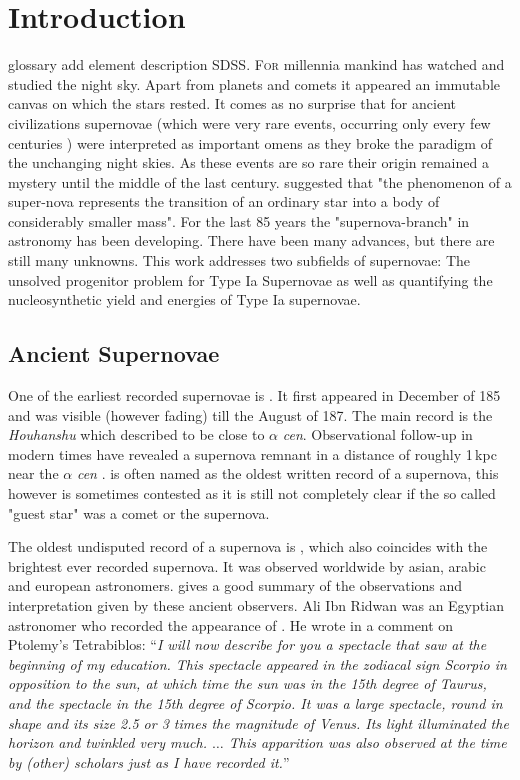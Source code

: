 \chapter{Introduction}
\label{chap:intro}
glossary add element description SDSS.
\lettrine[lines=4]{F}{or} millennia mankind has watched and studied the night sky. Apart from planets and comets it appeared an immutable canvas on which the stars rested. It comes as no surprise that for ancient civilizations supernovae (which were very rare events, occurring only every few centuries ) were interpreted as important omens as they broke the paradigm of the unchanging night skies. As these events are so rare their origin remained a mystery until the middle of the last century. \citet{1934PNAS...20..254B} suggested that "the phenomenon of a super-nova represents the transition of an ordinary star into a body of considerably smaller mass". For the last 85 years the "supernova-branch" in astronomy has been developing. There have been many advances, but there are still many unknowns. This work addresses two subfields of supernovae: The unsolved progenitor problem for Type Ia Supernovae as well as quantifying the nucleosynthetic yield and energies of Type Ia supernovae.


\section{Ancient Supernovae}
\label{sec:ancientsn}

One of the earliest recorded supernovae is . It first appeared in December of 185 and was visible (however fading) till the August of 187. The main record is the \textit{Houhanshu} \citep{2006ChJAA...6..635Z} which described  to be close to $\alpha$ \textit{cen}. Observational follow-up in modern times have revealed a supernova remnant in a distance of roughly 1\,kpc near the $\alpha$ \textit{cen} \citep{2006ChJAA...6..635Z}.  is often named as the oldest written record of a supernova, this however is sometimes contested as it is still not completely clear if the so called "guest star" was a comet or the supernova.

The oldest undisputed record of a supernova is , which also coincides with the brightest ever recorded supernova.  It was observed worldwide by asian, arabic and european astronomers. \citet{1965AJ.....70..105G} gives a good summary of the observations and interpretation given by these ancient observers. Ali Ibn Ridwan was an Egyptian astronomer who recorded the appearance of . He wrote in a comment on Ptolemy's Tetrabiblos: ``\textit{I will now describe for you a spectacle that saw at the beginning of my education. This spectacle appeared in the zodiacal sign Scorpio in opposition to the sun, at which time the sun was in the 15th degree of Taurus, and the spectacle in the 15th degree of Scorpio. It was a large spectacle, round in shape and its size 2.5 or 3 times the magnitude of Venus. Its light illuminated the horizon and twinkled very much. $\dots$ This apparition was also observed at the time by (other) scholars just as I have recorded it.}''

